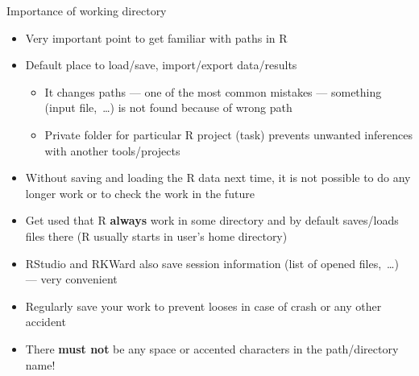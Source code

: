 \documentclass[compress, xelatex, 11pt, xcolor=svgnames, aspectratio=169,
	hyperref={
		bookmarks=true,
		unicode=true,
		colorlinks=true,
		pdftitle={Molecular data in R},
		plainpages=false,
		pdfauthor={Vojtech Zeisek},
		pdfsubject={Course about phylogeny and evolution in R},
		pdfcreator={XeLaTeX},
		pdfkeywords={R, evolution, phylogeny, molecular data},
		linkcolor=Crimson, %
		anchorcolor=Magenta, %
		citecolor=Magenta, %
		filecolor=Magenta, %
		menucolor=Magenta, %
		urlcolor=DodgerBlue, %
		},
	url={hyphens, lowtilde} %
	]{beamer}
\begin{document}
\begin{frame}{Importance of working directory}
	\begin{itemize}
	 \item Very important point to get familiar with paths in R
		\item Default place to load/save, import/export data/results
		\begin{itemize}
			\item It changes paths --- one of the most common mistakes --- something (input file,~\ldots) is not found because of wrong path
			\item Private folder for particular R project (task) prevents unwanted inferences with another tools/projects
		\end{itemize}
		\item Without saving and loading the R data next time, it is not possible to do any longer work or to check the work in the future
		\item \alert{Get used that R \textbf{always} work in some directory and by default saves/loads files there} (R usually starts in user's home directory)
		\item RStudio and RKWard also save session information (list of opened files,~\ldots) --- very convenient
		\item Regularly save your work to prevent looses in case of crash or any other accident
		\item \alert{There \textbf{must not} be any space or accented characters in the path/directory name!}
	\end{itemize}
\end{frame}
\end{document}
